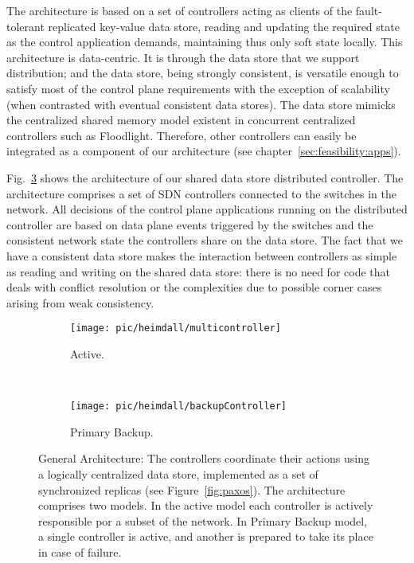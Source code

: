 The architecture is based on a set of controllers acting as clients of the fault-tolerant replicated key-value data store, reading and updating the required state as the control application demands, maintaining thus only soft state locally. 
This architecture is data-centric. 
It is through the data store that we support distribution;  and the data store, being strongly consistent,  is versatile enough to satisfy most of the control plane requirements with the exception of scalability (when contrasted with eventual consistent data stores). 
The data store mimicks the centralized shared memory model existent in concurrent centralized controllers such as Floodlight. 
Therefore, other controllers can easily be integrated as a component of our architecture  (see chapter~\ref{sec:feasibility:apps}). 

Fig.~\ref{fig:architecture} shows the architecture of our shared data store distributed controller.
The architecture comprises a set of SDN controllers connected to the switches in the network.
All decisions of the control plane applications running on the distributed controller are based on data plane events triggered by the switches and the consistent network state the controllers share on the data store.
The fact that we have a consistent data store makes the interaction between controllers as simple as reading and writing on the shared data store: there is no need for code that deals with conflict resolution or the complexities due to possible corner cases arising from weak consistency.


\begin{figure}
  \centering
  \begin{subfigure}[b]{0.545\textwidth}
                \centering
                \texttt{[image: pic/heimdall/multicontroller]}
                \caption{Active.}
                \label{fig:heimdall:active}
        \end{subfigure}%
        ~
        \begin{subfigure}[b]{0.465\textwidth}
                \centering
                \texttt{[image: pic/heimdall/backupController]}
                \caption{Primary Backup.}
                \label{fig:heimdall:primary-backup}
        \end{subfigure}
        \caption[General Architecture.]{General Architecture: The controllers coordinate their actions using a logically centralized data store, implemented as a set of synchronized replicas (see Figure~\ref{fig:paxos}). The architecture comprises two models. In the active model each controller is actively responsible por a subset of the network. In Primary Backup model, a single controller is active, and another is prepared to take its place in case of failure.}
        \label{fig:architecture} 
\end{figure}

